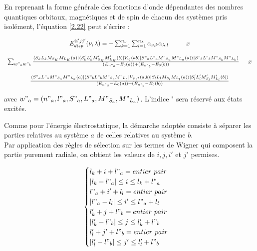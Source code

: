 	En reprenant la forme générale des fonctions d'onde dépendantes des nombres quantiques orbitaux, magnétiques et de spin de chacun des systèmes pris isolément, l'équation \ref{2.22} peut s'écrire : 
	
	\begin{equation}
	\begin{array}{c}
	E_{disp}^{ii'jj'} (\nu , \lambda) = - \sum_{k=1}^{n_{\nu}} \sum_{l=1}^{n_{\lambda}} \alpha_{\nu , k} \alpha_{\lambda , l} \hspace{1cm} x \\
	\\
	\sum_{w"_{a} w"_{b}} \frac{\langle S_{k} L_{k} M_{S_{K}} M_{L_{K}} (a) |\langle S'_{k} L'_{k} M'_{S_{K}} M'_{L_{K}} (b)| V_{ij} (ab) | S"_{a} L"_{a} M"_{S_{a}} M"_{L_{a}} (a)\rangle| S"_{b} L"_{b} M"_{S_{b}} M"_{L_{b}} \rangle}{(E_{n"_{a}} - E_{0}(a)) + (E_{n"_{b}} - E_{0}(b))} \hspace{0.5 cm} x \\
	\\
	\frac{\langle S"_{a} L"_{a} M"_{S_{a}} M"_{L_{a}} (a)| \langle S"_{b} L"_{b} M"_{S_{b}} M"_{L_{b}} | V_{i'j'}(a,b)| S_{l} L_{l} M_{S_{l}} M_{L_{l}} (a) \rangle | S'_{l} L'_{l} M'_{S_{l}} M'_{L_{l}} (b) \rangle}{(E_{n"_{a}} - E_{0} (a)) + (E_{n"_{b}} - E_{0}(b))}
	\end{array}
	\end{equation}
	
	avec $w"_{a} = (n"_{a}, l"_{a}, S"_{a}, L"_{a}, M"_{S_{a}}, M"_{L_{a}})$. L'indice " sera réservé aux états excités. 
	
	Comme pour l'énergie électrostatique, la démarche adoptée consiste à séparer les parties relatives au système $a$ de celles relatives au système $b$. \\
	
	Par application des règles de sélection sur les termes de Wigner qui composent la partie purement radiale, on obtient les valeurs de $i, j, i'$ et $j'$ permises. 
	
	\begin{equation}
	\begin{cases}
	l_{k} + i + l"_{a} = entier\ pair \\
	|l_{k} - l"_{a}| \leq i \leq l_{k} + l"_{a} \\
	l"_{a} + i' + l_{l} = entier\ pair \\
	|l"_{a} - l_{l}| \leq i' \leq l"_{a} + l_{l} \\
	l'_{k} + j + l"_{b} = entier\ pair \\
	|l'_{k} - l"_{b}| \leq j \leq l'_{k} + l"_{b} \\
	l'_{l} + j' + l"_{b} = entier\ pair \\
	|l'_{l} - l"_{b}| \leq j' \leq l'_{l} + l"_{b}
	\end{cases}
	\end{equation}
	
